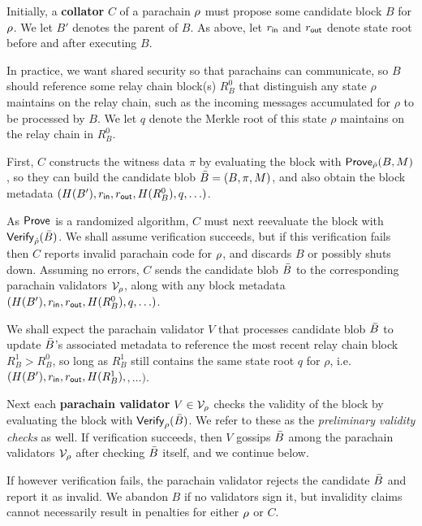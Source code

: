 Initially, a {\bf collator} $C$ of a parachain $\rho$ must propose some candidate block $B$ for $\rho$.  We let $B'$ denotes the parent of $B$.  As above, let $r_{\mathsf{in}}$ and $r_{\mathsf{out}}$ denote state root before and after executing $B$.  

In practice, we want shared security so that parachains can communicate, so $B$ should reference some relay chain block(s) $R^0_B$ that distinguish any state $\rho$ maintains on the relay chain, such as the incoming messages accumulated for $\rho$ to be processed by $B$.  We let $q$ denote the Merkle root of this state $\rho$ maintains on the relay chain in $R^0_B$.
 
First, $C$ constructs the witness data $\pi$ by evaluating the block with $\mathsf{Prove}_{\hat{\rho}}(B,M)$, so they can build the candidate blob $\bar{B} = (B,\pi,M)$, and also obtain the block metadata $(H(B'),r_{\mathsf{in}},r_{\mathsf{out}},H(R^0_B),q,\ldots)$. 

As $\mathsf{Prove}$ is a randomized algorithm, $C$ must next reevaluate the block with $\mathsf{Verify}_{\hat{\rho}}(\bar{B})$.  We shall assume verification succeeds, but if this verification fails then $C$ reports invalid parachain code for $\rho$, and discards $B$ or possibly shuts down.  Assuming no errors, $C$ sends the candidate blob $\bar{B}$ to the corresponding parachain validators $\mathcal{V}_{\rho}$, along with any block metadata $(H(B'),r_{\mathsf{in}},r_{\mathsf{out}},H(R^0_B),q,\ldots)$. 

\smallskip

We shall expect the parachain validator $V$ that processes candidate blob $\bar{B}$ to update $\bar{B}$'s associated metadata to reference the most recent relay chain block $R^1_B > R^0_B$, so long as $R^1_B$ still contains the same state root $q$ for $\rho$, 
i.e.\ $(H(B'),r_{\mathsf{in}},r_{\mathsf{out}},H(R^1_B),$$,\ldots)$.

Next each {\bf parachain validator} $V \in \mathcal{V}_{\rho}$ checks the validity of the block by evaluating the block with $\mathsf{Verify}_{\rho}(\bar{B})$.  We refer to these as the {\em preliminary validity checks} as well.  If verification succeeds, then $V$ gossips $\bar{B}$ among the parachain validators $\mathcal{V}_{\rho}$ after checking $\bar{B}$ itself, and we continue below.

If however verification fails, the parachain validator rejects the candidate $\bar{B}$ and report it as invalid.  We abandon $B$ if no validators sign it, but invalidity claims cannot necessarily result in penalties for either $\rho$ or $C$.  

